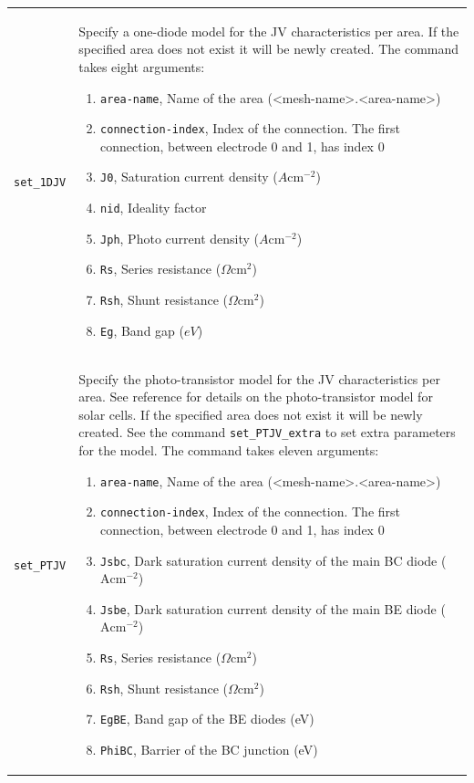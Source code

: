 \documentclass[noshowpacs,preprintnumbers,amsmath,amssymb, letter]{revtex4}
\begin{document}
\begin{longtable}{p{}p{}}
\texttt{set\_1DJV}	&  Specify a one-diode model for the JV characteristics per area. If the specified area does not exist it will be newly created. The command takes eight arguments:
\begin{enumerate}
\item \texttt{area-name}, Name of the area (\textless mesh-name\textgreater .\textless area-name\textgreater )
\item \texttt{connection-index}, Index of the connection. The first connection, between electrode 0 and 1,  has index 0
\item \texttt{J0}, Saturation current density ($A \text{cm}^{-2}$)
\item \texttt{nid}, Ideality factor
\item \texttt{Jph}, Photo current density ($A \text{cm}^{-2}$)
\item \texttt{Rs}, Series resistance ($\Omega \text{cm}^2$)
\item \texttt{Rsh}, Shunt resistance ($\Omega \text{cm}^2$)
\item \texttt{Eg}, Band gap ($eV$)
\end{enumerate}\\
\texttt{set\_PTJV}	&  Specify the photo-transistor model for the JV characteristics per area.  See reference \cite{Walter:photo-T} for details on the photo-transistor model for solar cells. If the specified area does not exist it will be newly created. See the command \texttt{set\_PTJV\_extra} to set extra parameters for the model. The command takes eleven arguments:
\begin{enumerate}
\item \texttt{area-name}, Name of the area (\textless mesh-name\textgreater .\textless area-name\textgreater )
\item \texttt{connection-index}, Index of the connection. The first connection, between electrode 0 and 1,  has index 0
\item \texttt{Jsbc},  Dark saturation current density of the main BC diode ($\text{A}\text{cm}^{-2}$)
\item \texttt{Jsbe},  Dark saturation current density of the main BE diode  ($\text{A}\text{cm}^{-2}$)
\item \texttt{Rs}, Series resistance ($\Omega \text{cm}^2$)
\item \texttt{Rsh}, Shunt resistance ($\Omega \text{cm}^2$)
\item \texttt{EgBE},  Band gap of the BE diodes (eV)
\item \texttt{PhiBC},  Barrier of the BC junction (eV)

\end{enumerate}
\end{longtable}
\end{document}
